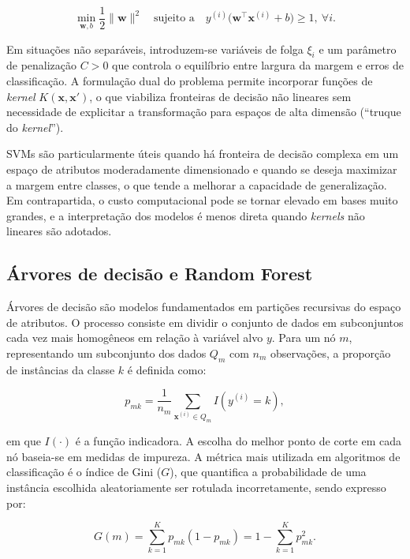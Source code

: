 \begin{equation}
\min_{\mathbf{w}, b} \frac{1}{2} \lVert \mathbf{w} \rVert^2
\quad \text{sujeito a} \quad
y^{(i)} \bigl(\mathbf{w}^\top \mathbf{x}^{(i)} + b\bigr) \geq 1,\ \forall i.
\end{equation}

Em situações não separáveis, introduzem-se variáveis de folga $\xi_i$ e um parâmetro de penalização $C>0$ que controla o equilíbrio entre largura da margem e erros de classificação. A formulação dual do problema permite incorporar funções de \textit{kernel} $K(\mathbf{x},\mathbf{x}')$, o que viabiliza fronteiras de decisão não lineares sem necessidade de explicitar a transformação para espaços de alta dimensão (``truque do \textit{kernel}'').

SVMs são particularmente úteis quando há fronteira de decisão complexa em um espaço de atributos moderadamente dimensionado e quando se deseja maximizar a margem entre classes, o que tende a melhorar a capacidade de generalização. Em contrapartida, o custo computacional pode se tornar elevado em bases muito grandes, e a interpretação dos modelos é menos direta quando \textit{kernels} não lineares são adotados.

\subsection{Árvores de decisão e Random Forest}

Árvores de decisão são modelos fundamentados em partições recursivas do espaço de atributos. O processo consiste em dividir o conjunto de dados em subconjuntos cada vez mais homogêneos em relação à variável alvo $y$. Para um nó $m$, representando um subconjunto dos dados $Q_m$ com $n_m$ observações, a proporção de instâncias da classe $k$ é definida como:

\begin{equation}
p_{mk} = \frac{1}{n_m} \sum_{\mathbf{x}^{(i)} \in Q_m} I(y^{(i)} = k),
\end{equation}

em que $I(\cdot)$ é a função indicadora. A escolha do melhor ponto de corte em cada nó baseia-se em medidas de impureza. A métrica mais utilizada em algoritmos de classificação é o índice de Gini ($G$), que quantifica a probabilidade de uma instância escolhida aleatoriamente ser rotulada incorretamente, sendo expresso por:

\begin{equation}
G(m) = \sum_{k=1}^K p_{mk} (1 - p_{mk}) = 1 - \sum_{k=1}^K p_{mk}^2.
\end{equation}


